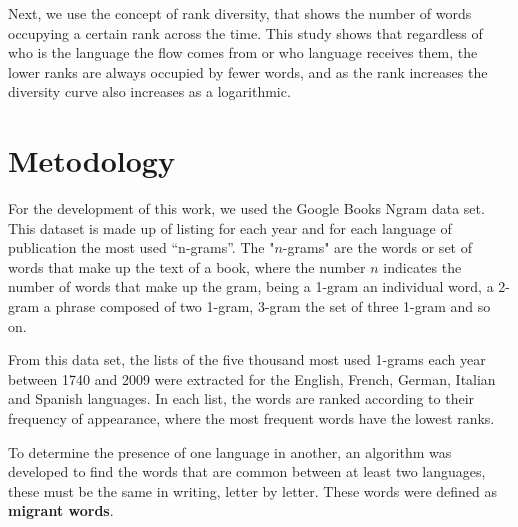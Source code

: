 \documentclass[10pt,letterpaper]{article} %
\begin{document}
Next, we use the concept of rank diversity,  that shows the number of words
occupying a certain rank across the time. This study shows that  regardless of
who is the language the flow comes from or who language receives them,  the
lower ranks are always occupied by fewer  words, and as the rank increases the
diversity curve also increases as a logarithmic. 
 

\section*{Metodology} %


For the development of this work,  we used the Google Books Ngram data set.
This dataset is made up of listing for each year and for each language of
publication the most used “n-grams”. The "$n$-grams" are the words or set of
words that make up the text of a book, where the number $n$ indicates the number
of words that make up the gram, being a 1-gram an individual word, a 2-gram a
phrase composed of two 1-gram, 3-gram the set of three 1-gram and so on.

From this data set, the lists of the five thousand most used 1-grams each year
between 1740 and 2009 were extracted for the English, French, German, Italian
and Spanish languages. In each list, the words are ranked according to their
frequency of appearance, where the most frequent words have the lowest ranks.

To determine the presence of one language in another, an algorithm was
developed to find the words that are common between at least two languages,
these must be the same in writing, letter by letter. These words were defined
as \textbf{migrant words}. 
\end{document}
